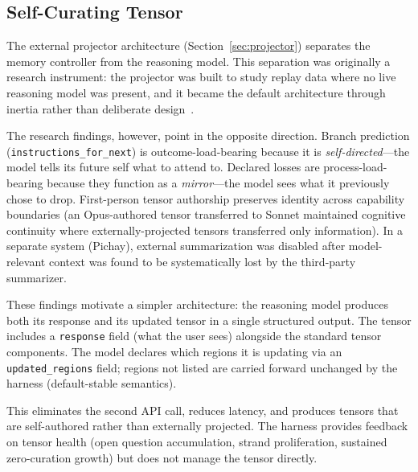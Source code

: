 

\subsection{Self-Curating Tensor}
\label{sec:self-curating}

The external projector architecture (Section~\ref{sec:projector}) separates
the memory controller from the reasoning model. This separation was originally
a research instrument: the projector was built to study replay data where no
live reasoning model was present, and it became the default architecture
through inertia rather than deliberate design~\cite{pichay-disabled}.

The research findings, however, point in the opposite direction. Branch
prediction (\texttt{instructions\_for\_next}) is outcome-load-bearing because
it is \emph{self-directed}---the model tells its future self what to attend to.
Declared losses are process-load-bearing because they function as a
\emph{mirror}---the model sees what it previously chose to drop. First-person
tensor authorship preserves identity across capability boundaries (an
Opus-authored tensor transferred to Sonnet maintained cognitive continuity
where externally-projected tensors transferred only information). In a
separate system (Pichay), external summarization was disabled after
model-relevant context was found to be systematically lost by the third-party
summarizer.

These findings motivate a simpler architecture: the reasoning model produces
both its response and its updated tensor in a single structured output. The
tensor includes a \texttt{response} field (what the user sees) alongside
the standard tensor components. The model declares which regions it is
updating via an \texttt{updated\_regions} field; regions not listed are
carried forward unchanged by the harness (default-stable semantics).

This eliminates the second API call, reduces latency, and produces tensors
that are self-authored rather than externally projected. The harness provides
feedback on tensor health (open question accumulation, strand proliferation,
sustained zero-curation growth) but does not manage the tensor directly.

